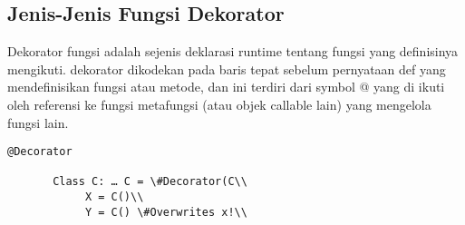 \documentclass[12pt,a4paper]{article}
\begin{document}
\subsection{Jenis-Jenis Fungsi Dekorator}


Dekorator fungsi adalah sejenis deklarasi runtime tentang fungsi yang definisinya mengikuti. dekorator dikodekan pada baris tepat sebelum pernyataan def yang mendefinisikan fungsi atau metode, dan ini terdiri dari symbol @ yang di ikuti oleh referensi ke fungsi metafungsi (atau objek callable lain) yang mengelola fungsi lain.


\begin{verbatim}
@Decorator

       Class C: … C = \#Decorator(C\\
            X = C()\\
            Y = C() \#Overwrites x!\\
\end{verbatim}
            
\end{document}
